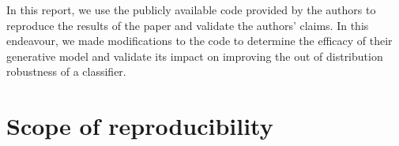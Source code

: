 In this report, we use the publicly available code provided by the authors to reproduce the results of the paper and validate the authors' claims. In this endeavour, we made modifications to the code to determine the efficacy of their generative model and validate its impact on improving the out of distribution robustness of a classifier.

\section{Scope of reproducibility}
\label{sec:claims}



